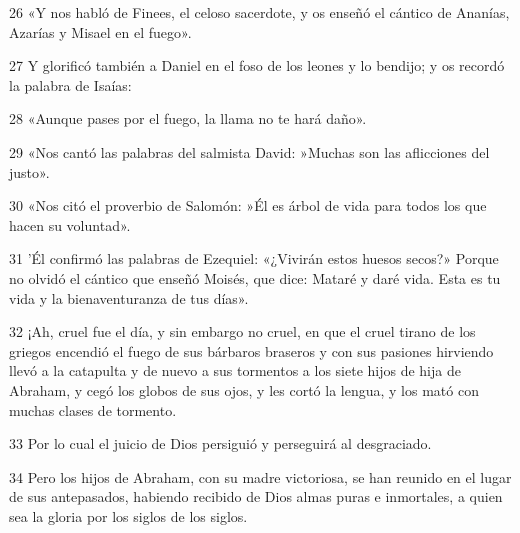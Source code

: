 \par 26 «Y nos habló de Finees, el celoso sacerdote, y os enseñó el cántico de Ananías, Azarías y Misael en el fuego».

\par 27 Y glorificó también a Daniel en el foso de los leones y lo bendijo; y os recordó la palabra de Isaías:

\par 28 «Aunque pases por el fuego, la llama no te hará daño».

\par 29 «Nos cantó las palabras del salmista David: »Muchas son las aflicciones del justo».

\par 30 «Nos citó el proverbio de Salomón: »Él es árbol de vida para todos los que hacen su voluntad».

\par 31 'Él confirmó las palabras de Ezequiel: «¿Vivirán estos huesos secos?» Porque no olvidó el cántico que enseñó Moisés, que dice: Mataré y daré vida. Esta es tu vida y la bienaventuranza de tus días».

\par 32 ¡Ah, cruel fue el día, y sin embargo no cruel, en que el cruel tirano de los griegos encendió el fuego de sus bárbaros braseros y con sus pasiones hirviendo llevó a la catapulta y de nuevo a sus tormentos a los siete hijos de hija de Abraham, y cegó los globos de sus ojos, y les cortó la lengua, y los mató con muchas clases de tormento.

\par 33 Por lo cual el juicio de Dios persiguió y perseguirá al desgraciado.

\par 34 Pero los hijos de Abraham, con su madre victoriosa, se han reunido en el lugar de sus antepasados, habiendo recibido de Dios almas puras e inmortales, a quien sea la gloria por los siglos de los siglos.


